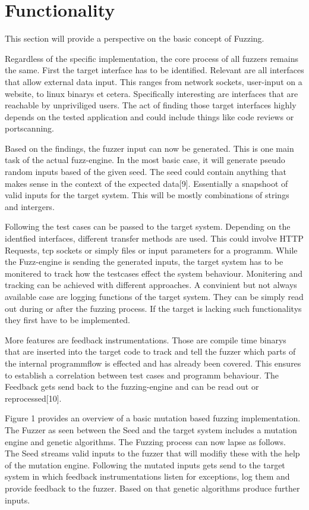 \documentclass[journal=tosc,final]{iacrtrans}
\begin{document}
\section{Functionality}
This section will provide a perspective on the basic concept of Fuzzing.

Regardless of the specific implementation, the core process of all fuzzers remains the same. First the target interface has to be identified. Relevant are all interfaces that allow external data input. This ranges from network sockets, user-input on a website, to linux binarys et cetera. Specifically interesting are interfaces that are reachable by unpriviliged users. The act of finding those target interfaces highly depends on the tested application and could include things like code reviews or portscanning. 


Based on the findings, the fuzzer input can now be generated. This is one main task of the actual fuzz-engine. In the most basic case, it will generate pseudo random inputs based of the given seed. The seed could contain anything that makes sense in the context of the expected data[9]. Essentially a snapshoot of valid inputs for the target system. This will be mostly combinations of strings and intergers. 

Following the test cases can be passed to the  target system. Depending on the identfied interfaces, different transfer methods are used. This could involve HTTP Requests, tcp sockets or simply files or input parameters for a programm. While the Fuzz-engine is sending the generated inputs, the target system has to be monitered to track how the testcases effect the system behaviour. Monitering and tracking can be achieved with different approaches. A convinient but not always available case are logging functions of the target system. They can be simply read out during or after the fuzzing process. If the target is lacking such functionalitys they first have to be implemented. 

More features are feedback instrumentations. Those are compile time binarys that are inserted into the target code to track and tell the fuzzer which parts of the internal programmflow is effected and has already been covered. This ensures to establish a correlation between test cases and programm behaviour. The Feedback gets send back to the fuzzing-engine and can be read out or reprocessed[10].
\newpage

\noindent Figure 1 provides an overview of a basic mutation based fuzzing implementation. The Fuzzer as seen between the Seed and the target system includes a mutation engine and genetic algorithms. The Fuzzing process can now lapse as follows.\\
The Seed streams valid inputs to the fuzzer that will modifiy these with the help of the mutation engine. Following the mutated inputs gets send to the target system in which feedback instrumentations listen for exceptions, log them and provide feedback to the fuzzer. Based on that genetic algorithms produce further inputs.
\end{document}
